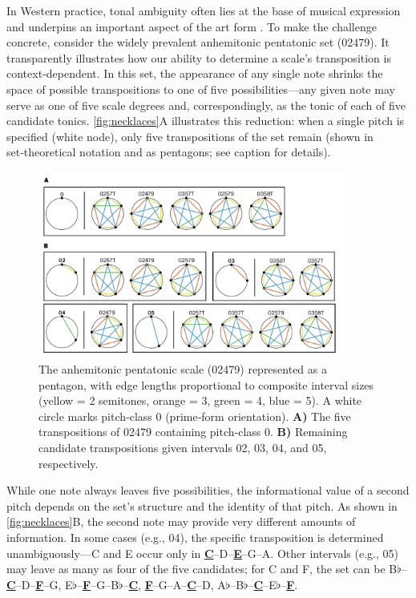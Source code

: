 \documentclass[10pt,twocolumn]{article}
\numberwithin{equation}{section} %
\begin{document}
    In Western practice, tonal ambiguity often lies at the base of musical expression and underpins an important aspect of the art form \citep{NodenSkinner1984, Richards2017, Smith1992, Temperley2007, Uchida1990}.
    To make the challenge concrete, consider the widely prevalent anhemitonic pentatonic set (02479).
    It transparently illustrates how our ability to determine a scale’s transposition is context‑dependent.
    In this set, the appearance of any single note shrinks the space of possible transpositions to one of five possibilities—any given note may serve as one of five scale degrees and, correspondingly, as the tonic of each of five candidate tonics.
    \autoref{fig:necklaces}A illustrates this reduction: when a single pitch is specified (white node), only five transpositions of the set remain (shown in set‑theoretical notation and as pentagons; see caption for details).

    \begin{figure}[htbp]
        \centering
        \includegraphics[width=0.9\textwidth]{pentatonic-necklaces}%
        \caption{The anhemitonic pentatonic scale (02479) represented as a pentagon, with edge lengths proportional to composite interval sizes (yellow = 2 semitones, orange = 3, green = 4, blue = 5).
        A white circle marks pitch‑class 0 (prime‑form orientation).
        \textbf{A)} The five transpositions of 02479 containing pitch‑class 0.
        \textbf{B)} Remaining candidate transpositions given intervals 02, 03, 04, and 05, respectively.}
        \label{fig:necklaces}
    \end{figure}

    While one note always leaves five possibilities, the informational value of a second pitch depends on the set’s structure and the identity of that pitch.
    As shown in \autoref{fig:necklaces}B, the second note may provide very different amounts of information.
    In some cases (e.g., 04), the specific transposition is determined unambiguously—C and E occur only in \textbf{\uline{C}}–D–\textbf{\uline{E}}–G–A.
    Other intervals (e.g., 05) may leave as many as four of the five candidates; for C and F, the set can be
    B$\flat$–\textbf{\underline{C}}–D–\textbf{\underline{F}}–G,\quad
    E$\flat$–\textbf{\underline{F}}–G–B$\flat$–\textbf{\underline{C}},\quad
    \textbf{\underline{F}}–G–A–\textbf{\underline{C}}–D,\quad
    A$\flat$–B$\flat$–\textbf{\underline{C}}–E$\flat$–\textbf{\underline{F}}.
\end{document}
